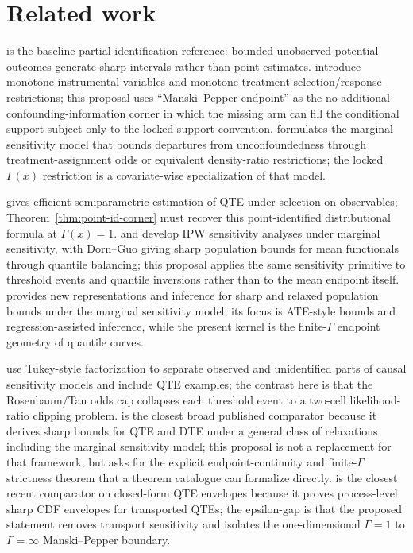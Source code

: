 \documentclass[11pt]{article}
\theoremstyle{definition}
\theoremstyle{plain}
\theoremstyle{remark}
\begin{document}
\section{Related work}
\citet{Manski1990} is the baseline partial-identification reference: bounded unobserved potential outcomes generate sharp intervals rather than point estimates.  \citet{ManskiPepper2000} introduce monotone instrumental variables and monotone treatment selection/response restrictions; this proposal uses ``Manski--Pepper endpoint'' as the no-additional-confounding-information corner in which the missing arm can fill the conditional support subject only to the locked support convention.  \citet{Tan2006} formulates the marginal sensitivity model that bounds departures from unconfoundedness through treatment-assignment odds or equivalent density-ratio restrictions; the locked \(\Gamma(x)\) restriction is a covariate-wise specialization of that model.

\citet{Firpo2007} gives efficient semiparametric estimation of QTE under selection on observables; Theorem~\ref{thm:point-id-corner} must recover this point-identified distributional formula at \(\Gamma(x)=1\).  \citet{ZhaoSmallBhattacharya2019} and \citet{DornGuo2023} develop IPW sensitivity analyses under marginal sensitivity, with Dorn--Guo giving sharp population bounds for mean functionals through quantile balancing; this proposal applies the same sensitivity primitive to threshold events and quantile inversions rather than to the mean endpoint itself.  \citet{Tan2024} provides new representations and inference for sharp and relaxed population bounds under the marginal sensitivity model; its focus is ATE-style bounds and regression-assisted inference, while the present kernel is the finite-\(\Gamma\) endpoint geometry of quantile curves.

\citet{DAmourFranksFeller2020} use Tukey-style factorization to separate observed and unidentified parts of causal sensitivity models and include QTE examples; the contrast here is that the Rosenbaum/Tan odds cap collapses each threshold event to a two-cell likelihood-ratio clipping problem.  \citet{MastenPoirierRen2025} is the closest broad published comparator because it derives sharp bounds for QTE and DTE under a general class of relaxations including the marginal sensitivity model; this proposal is not a replacement for that framework, but asks for the explicit endpoint-continuity and finite-\(\Gamma\) strictness theorem that a theorem catalogue can formalize directly.  \citet{Wang2026} is the closest recent comparator on closed-form QTE envelopes because it proves process-level sharp CDF envelopes for transported QTEs; the epsilon-gap is that the proposed statement removes transport sensitivity and isolates the one-dimensional \(\Gamma=1\) to \(\Gamma=\infty\) Manski--Pepper boundary.
\end{document}
